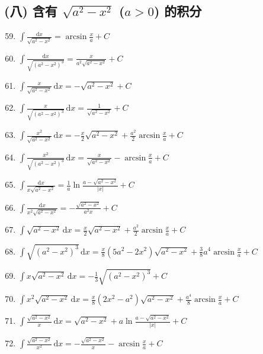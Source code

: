 \subsection*{(八) 含有 $\sqrt{a^2 - x^2}$ ($a > 0$) 的积分}

\begin{enumerate}
    \setcounter{enumi}{58}
    \item $\displaystyle \int \frac{\mathrm{d}x}{\sqrt{a^2 - x^2}} = \arcsin \frac{x}{a} + C$
    \item $\displaystyle \int \frac{\mathrm{d}x}{\sqrt{(a^2 - x^2)^3}} = \frac{x}{a^2 \sqrt{a^2 - x^2}} + C$
    \item $\displaystyle \int \frac{x}{\sqrt{a^2 - x^2}} \, \mathrm{d}x = -\sqrt{a^2 - x^2} + C$
    \item $\displaystyle \int \frac{x}{\sqrt{(a^2 - x^2)^3}} \, \mathrm{d}x = \frac{1}{\sqrt{a^2 - x^2}} + C$
    \item $\displaystyle \int \frac{x^2}{\sqrt{a^2 - x^2}} \, \mathrm{d}x = -\frac{x}{2} \sqrt{a^2 - x^2} + \frac{a^2}{2} \arcsin \frac{x}{a} + C$
    \item $\displaystyle \int \frac{x^2}{\sqrt{(a^2 - x^2)^3}} \, \mathrm{d}x = \frac{x}{\sqrt{a^2 - x^2}} - \arcsin \frac{x}{a} + C$
    \item $\displaystyle \int \frac{\mathrm{d}x}{x \sqrt{a^2 - x^2}} = \frac{1}{a} \ln \frac{a - \sqrt{a^2 - x^2}}{|x|} + C$
    \item $\displaystyle \int \frac{\mathrm{d}x}{x^2 \sqrt{a^2 - x^2}} = -\frac{\sqrt{a^2 - x^2}}{a^2 x} + C$
    \item $\displaystyle \int \sqrt{a^2 - x^2} \, \mathrm{d}x = \frac{x}{2} \sqrt{a^2 - x^2} + \frac{a^2}{2} \arcsin \frac{x}{a} + C$
    \item $\displaystyle \int \sqrt{(a^2 - x^2)^3} \, \mathrm{d}x = \frac{x}{8} (5a^2 - 2x^2) \sqrt{a^2 - x^2} + \frac{3}{8} a^4 \arcsin \frac{x}{a} + C$
    \item $\displaystyle \int x \sqrt{a^2 - x^2} \, \mathrm{d}x = -\frac{1}{3} \sqrt{(a^2 - x^2)^3} + C$
    \item $\displaystyle \int x^2 \sqrt{a^2 - x^2} \, \mathrm{d}x = \frac{x}{8} (2x^2 - a^2) \sqrt{a^2 - x^2} + \frac{a^4}{8} \arcsin \frac{x}{a} + C$
    \item $\displaystyle \int \frac{\sqrt{a^2 - x^2}}{x} \, \mathrm{d}x = \sqrt{a^2 - x^2} + a \ln \frac{a - \sqrt{a^2 - x^2}}{|x|} + C$
    \item $\displaystyle \int \frac{\sqrt{a^2 - x^2}}{x^2} \, \mathrm{d}x = -\frac{\sqrt{a^2 - x^2}}{x} - \arcsin \frac{x}{a} + C$
\end{enumerate}

